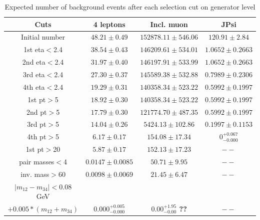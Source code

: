 \documentclass[aps,12pt,superscriptaddress,nofootinbib,floatfix,showpacs]{revtex4}
\begin{document}
\begin{table}[t]
\caption{Expected number of background events after each selection cut on generator level\label{bckgr_cuts_number_gen_level}}
\begin{center}
\begin{tabular}{|c|c|c|c|}
\hline
Cuts & 4 leptons & Incl. muon & JPsi \\ 
\hline
Initial number&            $48.21\pm0.49$    &    $152878.11\pm546.06$    &    $120.91\pm2.84$   \\ 
1st eta$<$2.4&             $38.54\pm0.43$    &    $146209.61\pm534.01$    &    $1.0652\pm0.2663$ \\ 
2nd eta$<$2.4&             $31.97\pm0.40$    &    $146197.91\pm533.99$    &    $1.0652\pm0.2663$ \\ 
3rd eta$<$2.4&             $27.30\pm0.37$    &    $145589.38\pm532.88$    &    $0.7989\pm0.2306$ \\ 
4th eta$<$2.4&             $19.29\pm0.31$    &    $140358.34\pm523.22$    &    $0.5992\pm0.1997$ \\ 
1st pt$>$5&                $18.92\pm0.30$    &    $140358.34\pm523.22$    &    $0.5992\pm0.1997$ \\ 
2nd pt$>$5&                $17.79\pm0.30$    &    $121774.70\pm487.35$    &    $0.5992\pm0.1997$ \\ 
3rd pt$>$5&                $14.04\pm0.26$    &    $5424.13\pm102.86$      &    $0.1997\pm0.1153$ \\ 
4th pt$>$5&                $6.17\pm0.17$     &    $154.08\pm17.34$        &    $0^{+0.067}_{-0.000}$      \\ 
1st pt$>$20&               $5.87\pm0.17$     &    $152.13\pm17.23$        &    $--$      \\ 
\hline
pair masses$<$4&           $0.0147\pm0.0085$ &    $50.71\pm9.95$          &    $--$      \\ 
inv. mass$>$60 &           $0.0098\pm0.0069$ &    $21.45\pm6.47$          &    $--$      \\ 
$|m_{12}-m_{34}|< 0.08$ GeV  &&&\\       
$+0.005*(m_{12}+m_{34})$ &  $0.000^{+0.005}_{-0.000}$ & {\bf $0.00^{+1.95}_{-0.00}$ ??}  &    $--$    \\ 
\hline
\end{tabular}
\end{center}
\end{table}
\end{document}
